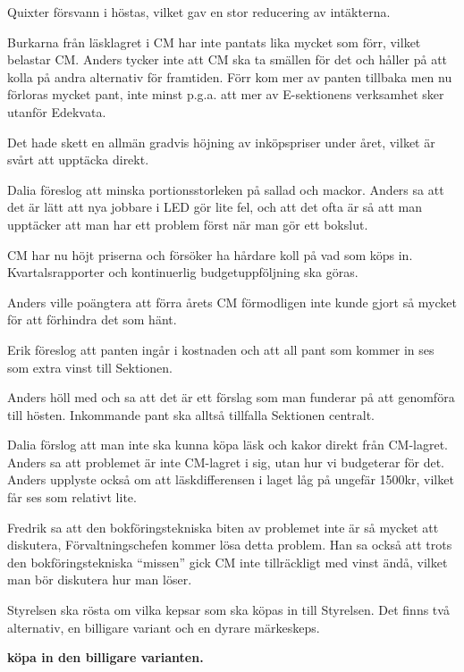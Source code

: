 \documentclass[10pt]{article}
\begin{document}
\begin{paragrafer}
\begin{dashlist}
\item Quixter försvann i höstas, vilket gav en stor reducering av intäkterna.
\item Burkarna från läsklagret i CM har inte pantats lika mycket som förr, vilket belastar CM. Anders tycker inte att CM ska ta smällen för det och håller på att kolla på andra alternativ för framtiden. Förr kom mer av panten tillbaka men nu förloras mycket pant, inte minst p.g.a. att mer av E-sektionens verksamhet sker utanför Edekvata.
\item Det hade skett en allmän gradvis höjning av inköpspriser under året, vilket är svårt att upptäcka direkt.
\end{dashlist}

Dalia föreslog att minska portionsstorleken på sallad och mackor. Anders sa att det är lätt att nya jobbare i LED gör lite fel, och att det ofta är så att man upptäcker att man har ett problem först när man gör ett bokslut.

CM har nu höjt priserna och försöker ha hårdare koll på vad som köps in. Kvartalsrapporter och kontinuerlig budgetuppföljning ska göras.

Anders ville poängtera att förra årets CM förmodligen inte kunde gjort så mycket för att förhindra det som hänt.

Erik föreslog att panten ingår i kostnaden och att all pant som kommer in ses som extra vinst till Sektionen.

Anders höll med och sa att det är ett förslag som man funderar på att genomföra till hösten. Inkommande pant ska alltså tillfalla Sektionen centralt.

Dalia förslog att man inte ska kunna köpa läsk och kakor direkt från CM-lagret. Anders sa att problemet är inte CM-lagret i sig, utan hur vi budgeterar för det. Anders upplyste också om att läskdifferensen i laget låg på ungefär 1500kr, vilket får ses som relativt lite.

Fredrik sa att den bokföringstekniska biten av problemet inte är så mycket att diskutera, Förvaltningschefen kommer lösa detta problem. Han sa också att trots den bokföringstekniska ``missen'' gick CM inte tillräckligt med vinst ändå, vilket man bör diskutera hur man löser.

Styrelsen ska rösta om vilka kepsar som ska köpas in till Styrelsen. Det finns två alternativ, en billigare variant och en dyrare märkeskeps.

\textbf{\Mba köpa in den billigare varianten.}


\end{paragrafer}
\end{document}
